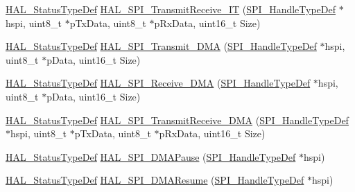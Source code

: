 \begin{DoxyCompactItemize}
\item 
\hyperlink{stm32f4xx__hal__def_8h_a63c0679d1cb8b8c684fbb0632743478f}{H\+A\+L\+\_\+\+Status\+Type\+Def} \hyperlink{group___s_p_i___exported___functions___group2_ga518c43d8323499451e7f4782a9dc6e32}{H\+A\+L\+\_\+\+S\+P\+I\+\_\+\+Transmit\+Receive\+\_\+\+IT} (\hyperlink{group___s_p_i___exported___types_gab3bd115785297692c125528b7293566b}{S\+P\+I\+\_\+\+Handle\+Type\+Def} $\ast$hspi, uint8\+\_\+t $\ast$p\+Tx\+Data, uint8\+\_\+t $\ast$p\+Rx\+Data, uint16\+\_\+t Size)
\item 
\hyperlink{stm32f4xx__hal__def_8h_a63c0679d1cb8b8c684fbb0632743478f}{H\+A\+L\+\_\+\+Status\+Type\+Def} \hyperlink{group___s_p_i___exported___functions___group2_ga6aebe304396c3e18b55f926dae0dadcb}{H\+A\+L\+\_\+\+S\+P\+I\+\_\+\+Transmit\+\_\+\+D\+MA} (\hyperlink{group___s_p_i___exported___types_gab3bd115785297692c125528b7293566b}{S\+P\+I\+\_\+\+Handle\+Type\+Def} $\ast$hspi, uint8\+\_\+t $\ast$p\+Data, uint16\+\_\+t Size)
\item 
\hyperlink{stm32f4xx__hal__def_8h_a63c0679d1cb8b8c684fbb0632743478f}{H\+A\+L\+\_\+\+Status\+Type\+Def} \hyperlink{group___s_p_i___exported___functions___group2_ga626bb2ec54e7b6ff9bd5d807ae6e6e24}{H\+A\+L\+\_\+\+S\+P\+I\+\_\+\+Receive\+\_\+\+D\+MA} (\hyperlink{group___s_p_i___exported___types_gab3bd115785297692c125528b7293566b}{S\+P\+I\+\_\+\+Handle\+Type\+Def} $\ast$hspi, uint8\+\_\+t $\ast$p\+Data, uint16\+\_\+t Size)
\item 
\hyperlink{stm32f4xx__hal__def_8h_a63c0679d1cb8b8c684fbb0632743478f}{H\+A\+L\+\_\+\+Status\+Type\+Def} \hyperlink{group___s_p_i___exported___functions___group2_ga228553c64b10b8dade9fee525a8a489d}{H\+A\+L\+\_\+\+S\+P\+I\+\_\+\+Transmit\+Receive\+\_\+\+D\+MA} (\hyperlink{group___s_p_i___exported___types_gab3bd115785297692c125528b7293566b}{S\+P\+I\+\_\+\+Handle\+Type\+Def} $\ast$hspi, uint8\+\_\+t $\ast$p\+Tx\+Data, uint8\+\_\+t $\ast$p\+Rx\+Data, uint16\+\_\+t Size)
\item 
\hyperlink{stm32f4xx__hal__def_8h_a63c0679d1cb8b8c684fbb0632743478f}{H\+A\+L\+\_\+\+Status\+Type\+Def} \hyperlink{group___s_p_i___exported___functions___group2_ga61e4a628d6918ec838736d65ae135031}{H\+A\+L\+\_\+\+S\+P\+I\+\_\+\+D\+M\+A\+Pause} (\hyperlink{group___s_p_i___exported___types_gab3bd115785297692c125528b7293566b}{S\+P\+I\+\_\+\+Handle\+Type\+Def} $\ast$hspi)
\item 
\hyperlink{stm32f4xx__hal__def_8h_a63c0679d1cb8b8c684fbb0632743478f}{H\+A\+L\+\_\+\+Status\+Type\+Def} \hyperlink{group___s_p_i___exported___functions___group2_ga7fdd4b7aa5c6bd560a476c833f546d93}{H\+A\+L\+\_\+\+S\+P\+I\+\_\+\+D\+M\+A\+Resume} (\hyperlink{group___s_p_i___exported___types_gab3bd115785297692c125528b7293566b}{S\+P\+I\+\_\+\+Handle\+Type\+Def} $\ast$hspi)

\end{DoxyCompactItemize}
